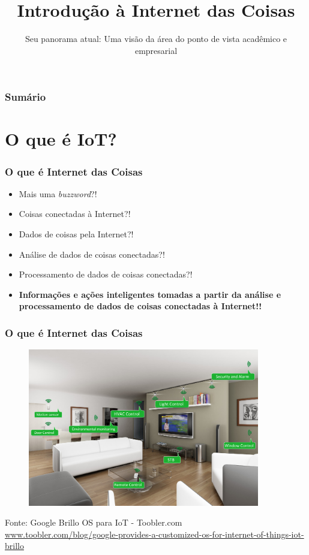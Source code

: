 \documentclass[t]{beamer}
\title{Introdução à Internet das Coisas}
\subtitle{Seu panorama atual: Uma visão da área do ponto de vista acadêmico e empresarial}
\begin{document}
\frame{\titlepage}

\begin{frame}
\frametitle{Sumário}
\tableofcontents
\end{frame}

\section{O que é IoT?}

\begin{frame}
\frametitle{O que é Internet das Coisas}

\begin{itemize}
	\item Mais uma \textit{buzzword}?!
	\item Coisas conectadas à Internet?!
	\item Dados de coisas pela Internet?!
	\item Análise de dados de coisas conectadas?!
	\item Processamento de dados de coisas conectadas?!
	\item \textbf{Informações e ações inteligentes tomadas a partir da análise e processamento de dados de coisas conectadas à Internet!!}
\end{itemize}
\end{frame}

\begin{frame}
	\frametitle{O que é Internet das Coisas}
	\begin{figure}
		\includegraphics[width=0.9\textwidth]{home-automation-google-brillo-os-1-1024x699}
	\end{figure}
	\scriptsize Fonte: Google Brillo OS para IoT - Toobler.com\\
	\tiny \url{www.toobler.com/blog/google-provides-a-customized-os-for-internet-of-things-iot-brillo}
\end{frame}
\end{document}
